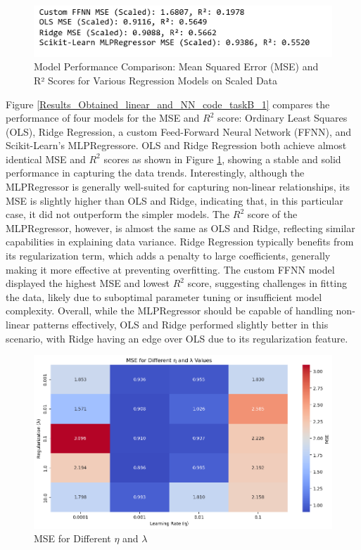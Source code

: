 \documentclass{article}
\newcommand{\0}{\mathbf{0}}
\newcommand{\1}{\mathbf{1}}
\begin{document}
\begin{figure}[h!]
    \centering
    \includegraphics[width=0.7\linewidth]{Values.png}
    \caption{Model Performance Comparison: Mean Squared Error (MSE) and R² Scores for Various Regression Models on Scaled Data}
    \label{values}
\end{figure}




Figure \ref{Results_Obtained_linear_and_NN_code_taskB_1} compares the performance of four models for the MSE and \( R^2 \) score: Ordinary Least Squares (OLS), Ridge Regression, a custom Feed-Forward Neural Network (FFNN), and Scikit-Learn's MLPRegressore. OLS and Ridge Regression both achieve almost identical MSE and \( R^2 \) scores as shown in Figure \ref{values}, showing a stable and solid performance in capturing the data trends. Interestingly, although the MLPRegressor is generally well-suited for capturing non-linear relationships, its MSE is slightly higher than OLS and Ridge, indicating that, in this particular case, it did not outperform the simpler models. The \( R^2 \) score of the MLPRegressor, however, is almost the same as OLS and Ridge, reflecting similar capabilities in explaining data variance. Ridge Regression typically benefits from its regularization term, which adds a penalty to large coefficients, generally making it more effective at preventing overfitting. The custom FFNN model displayed the highest MSE and lowest \( R^2 \) score, suggesting challenges in fitting the data, likely due to suboptimal parameter tuning or insufficient model complexity. Overall, while the MLPRegressor should be capable of handling non-linear patterns effectively, OLS and Ridge performed slightly better in this scenario, with Ridge having an edge over OLS due to its regularization feature.


\begin{figure}[h!]
    \centering
    \includegraphics[width=0.9\linewidth]{MSE_Lambda_Learning_rate_TaskB_3.png}
    \caption{MSE for Different \(\eta\) and \(\lambda\)}
    \label{MSE_Lambda_Learning_rate_TaskB_3}
\end{figure}
\end{document}
